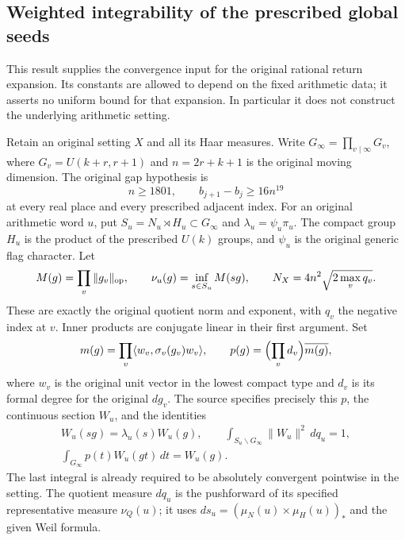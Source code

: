 \subsection{Weighted integrability of the prescribed global seeds}
\label{actual-seed-decay}

This result supplies the convergence input for the original rational
return expansion.  Its constants are allowed to depend on the fixed
arithmetic data; it asserts no uniform bound for that expansion.
In particular it does not construct the underlying arithmetic setting.

Retain an original setting $X$ and all its Haar measures.  Write
$G_\infty=\prod_{v\mid\infty}G_v$, where
$G_v=U(k+r,r+1)$ and $n=2r+k+1$ is the original moving dimension.
The original gap hypothesis is
\[
 n\ge1801,\qquad b_{j+1}-b_j\ge16n^{19}
\]
at every real place and every prescribed adjacent index.  For an
original arithmetic word $u$, put
$S_u=N_u\rtimes H_u\subset G_\infty$ and
$\lambda_u=\psi_u\pi_u$.  The compact group $H_u$ is the product
of the prescribed $U(k)$ groups, and $\psi_u$ is the original
generic flag character.  Let
\[
 M(g)=\prod_v\|g_v\|_{\rm op},\qquad
 \nu_u(g)=\inf_{s\in S_u}M(sg),\qquad
 N_X=4n^2\sqrt{2\max_v q_v}.
\]
These are exactly the original quotient norm and exponent, with
$q_v$ the negative index at $v$.  Inner products are conjugate
linear in their first argument.  Set
\[
 m(g)=\prod_v\langle w_v,\sigma_v(g_v)w_v\rangle,
 \qquad p(g)=\Bigl(\prod_vd_v\Bigr)\overline{m(g)},
\]
where $w_v$ is the original unit vector in the lowest compact
type and $d_v$ is its formal degree for the original $dg_v$.
The source specifies precisely this $p$, the continuous section
$W_u$, and the identities
\begin{equation}\label{actual-seed-original}
 \begin{gathered}
 W_u(sg)=\lambda_u(s)W_u(g),\qquad
 \int_{S_u\backslash G_\infty}\|W_u\|^2\,dq_u=1,\\
 \int_{G_\infty}p(t)W_u(gt)\,dt=W_u(g).
 \end{gathered}
\end{equation}
The last integral is already required to be absolutely convergent
pointwise in the setting.  The quotient measure $dq_u$ is the
pushforward of its specified representative measure $\nu_Q(u)$;
it uses $ds_u=(\mu_N(u)\times\mu_H(u))_*$ and the given Weil
formula.\cite{seed-decay-original}

